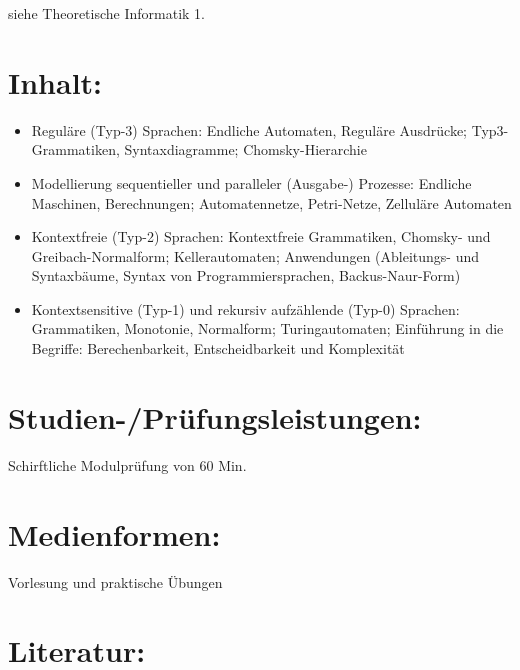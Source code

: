 siehe Theoretische Informatik 1.

\section*{Inhalt:}\label{inhalt-24}

\begin{itemize}
\tightlist
\item
  Reguläre (Typ-3) Sprachen: Endliche Automaten, Reguläre Ausdrücke;
  Typ3-Grammatiken, Syntaxdiagramme; Chomsky-Hierarchie
\item
  Modellierung sequentieller und paralleler (Ausgabe-) Prozesse:
  Endliche Maschinen, Berechnungen; Automatennetze, Petri-Netze,
  Zelluläre Automaten
\item
  Kontextfreie (Typ-2) Sprachen: Kontextfreie Grammatiken, Chomsky- und
  Greibach-Normalform; Kellerautomaten; Anwendungen (Ableitungs- und
  Syntaxbäume, Syntax von Programmiersprachen, Backus-Naur-Form)
\item
  Kontextsensitive (Typ-1) und rekursiv aufzählende (Typ-0) Sprachen:
  Grammatiken, Monotonie, Normalform; Turingautomaten; Einführung in die
  Begriffe: Berechenbarkeit, Entscheidbarkeit und Komplexität
\end{itemize}

\section*{Studien-/Prüfungsleistungen:}\label{studien-pruxfcfungsleistungen-22}

Schirftliche Modulprüfung von 60 Min.

\section*{Medienformen:}\label{medienformen-15}

Vorlesung und praktische Übungen

\section*{Literatur:}\label{literatur-20}

